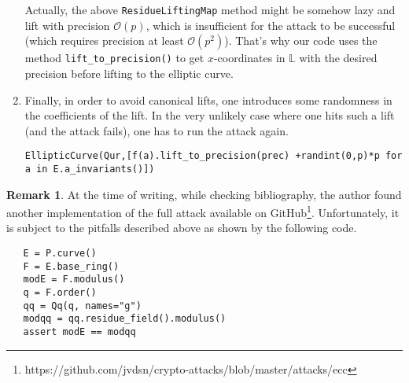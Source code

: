 \documentclass[10pt]{article}
\theoremstyle{definition}
\newtheorem{remark}{Remark}
\renewcommand{\L}{\mathbb{L}}
\begin{document}
\begin{enumerate}
Actually, the above \verb|ResidueLiftingMap| method might be somehow lazy and lift with precision $\mathcal{O}(p)$, which is insufficient for the attack to be successful (which requires precision at least $\mathcal{O}(p^2)$).
That's why our code uses the method \verb|lift_to_precision()| to get $x$-coordinates in $\L$ with the desired precision before lifting to the elliptic curve.

\item Finally, in order to avoid canonical lifts, one introduces some randomness in the coefficients of the lift.
In the very unlikely case where one hits such a lift (and the attack fails), one has to run the attack again.

\begin{verbatim}
EllipticCurve(Qur,[f(a).lift_to_precision(prec) +randint(0,p)*p for a in E.a_invariants()])
\end{verbatim}
\end{enumerate}
\begin{remark}
At the time of writing, while checking bibliography, the author found another implementation of the full attack available on GitHub\footnote{https://github.com/jvdsn/crypto-attacks/blob/master/attacks/ecc}.
Unfortunately, it is subject to the pitfalls described above as shown by the following code.
\begin{verbatim}
   E = P.curve()
   F = E.base_ring()
   modE = F.modulus()
   q = F.order()
   qq = Qq(q, names="g")
   modqq = qq.residue_field().modulus()
   assert modE == modqq
\end{verbatim}

\end{remark}




\end{document}
